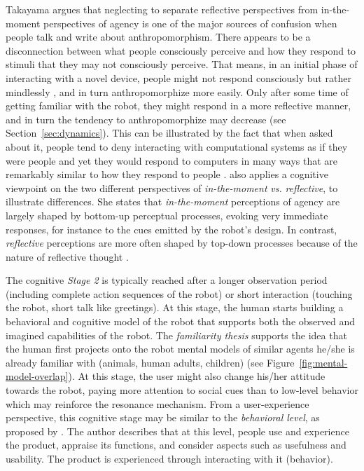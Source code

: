 \documentclass{frontiersSCNS} %
\begin{document}
Takayama argues that neglecting to separate reflective perspectives from in-the-moment perspectives of agency is one of the major sources of confusion when people talk and write about anthropomorphism. There appears to be a disconnection between what people consciously perceive and how they respond to stimuli that they may not consciously perceive. That means, in an initial phase of interacting with a novel device, people might not respond consciously but rather mindlessly \citep{nass_machines_2000}, and in turn anthropomorphize more easily. Only after some time of getting familiar with the robot, they might respond in a more reflective manner, and in turn the tendency to anthropomorphize may decrease (see Section~\ref{sec:dynamics}). This can be illustrated by the fact that when asked about it, people tend to deny interacting with computational systems as if they were people and yet they would respond to computers in many ways that are remarkably similar to how they respond to people \citep{reeves_media_1996}. \cite{takayama_perspectives_2012} also applies a cognitive viewpoint on the two different perspectives of \textit{in-the-moment} \textit{vs.} \textit{reflective}, to illustrate differences. She states that \textit{in-the-moment} perceptions of agency are largely shaped by bottom-up perceptual processes, evoking very immediate responses, for instance to the cues emitted by the robot's design. In contrast, \textit{reflective} perceptions are more often shaped by top-down processes because of the nature of reflective thought \citep{takayama_perspectives_2012}.

The cognitive \textit{Stage 2} is typically reached after a longer observation period (including complete action sequences of the robot) or short interaction (touching the robot, short talk like greetings). At this stage, the human starts building a behavioral and cognitive model of the robot that supports both the observed and imagined capabilities of the robot. The \textit{familiarity thesis} \citep{hegel_understanding_2008} supports the idea that the human first projects onto the robot mental models of similar agents he/she is already familiar with (animals, human adults, children) (see Figure~\ref{fig:mental-model-overlap}). At this stage, the user might also change his/her attitude towards the robot, paying more attention to social cues than to low-level behavior which may reinforce the resonance mechanism.
From a user-experience perspective, this cognitive stage may be similar to the \textit{behavioral level}, as proposed by \cite{norman_emotional_2003}. The author describes that at this level, people use and experience the product, appraise its functions, and consider aspects such as usefulness and usability. The product is experienced through interacting with it (behavior).
\end{document}
